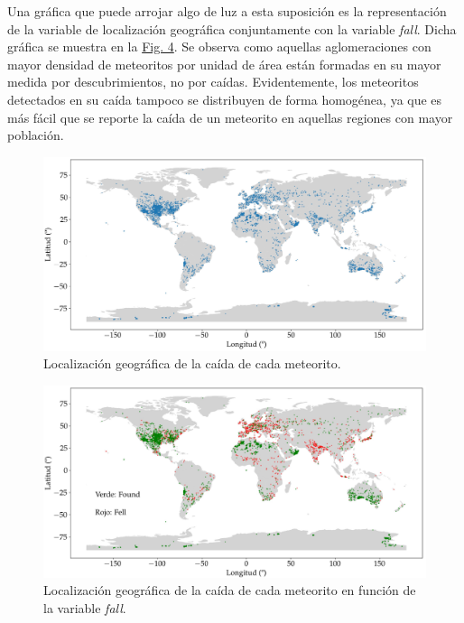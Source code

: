 \documentclass[12pt]{article}
\begin{document}
    Una gráfica que puede arrojar algo de luz a esta suposición es la representación de la variable de localización geográfica conjuntamente con la variable \textit{fall}. Dicha gráfica se muestra en la \hyperref[Fig:geo_fall]{Fig. 4}. Se observa como aquellas aglomeraciones con mayor densidad de meteoritos por unidad de área están formadas en su mayor medida por descubrimientos, no por caídas. Evidentemente, los meteoritos detectados en su caída tampoco se distribuyen de forma homogénea, ya que es más fácil que se reporte la caída de un meteorito en aquellas regiones con mayor población. 
	\clearpage
	\begin{landscape}
		\begin{figure}[t]
			\centering
			\label{Fig:geolocation}
			\includegraphics[scale=0.7]{geo_distribution}
			\caption{Localización geográfica de la caída de cada meteorito.}
		\end{figure}
	\clearpage
	    \begin{figure}[t]
	    	\centering
	    	\label{Fig:geo_fall}
	    	\includegraphics[scale=0.7]{geo_fall}
	    	\caption{Localización geográfica de la caída de cada meteorito en función de la variable \textit{fall}.}
	    \end{figure}
	\end{landscape}
\end{document}
